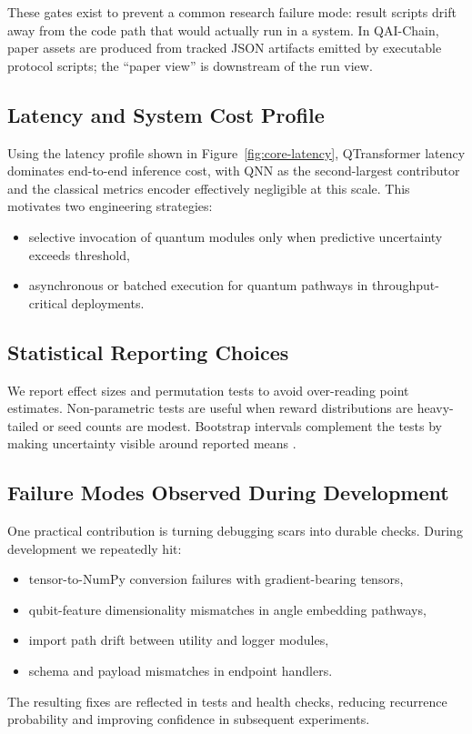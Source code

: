 These gates exist to prevent a common research failure mode: result scripts drift away from the code path that would actually run in a system. In QAI-Chain, paper assets are produced from tracked JSON artifacts emitted by executable protocol scripts; the ``paper view'' is downstream of the run view.

\subsection{Latency and System Cost Profile}
\label{sec:latency-profile}

Using the latency profile shown in Figure~\ref{fig:core-latency}, QTransformer latency dominates end-to-end inference cost, with QNN as the second-largest contributor and the classical metrics encoder effectively negligible at this scale. This motivates two engineering strategies:
\begin{itemize}
  \item selective invocation of quantum modules only when predictive uncertainty exceeds threshold,
  \item asynchronous or batched execution for quantum pathways in throughput-critical deployments.
\end{itemize}

\subsection{Statistical Reporting Choices}

We report effect sizes and permutation tests to avoid over-reading point estimates. Non-parametric tests are useful when reward distributions are heavy-tailed or seed counts are modest. Bootstrap intervals complement the tests by making uncertainty visible around reported means \citep{efron1994introduction,good2005permutation}.

\subsection{Failure Modes Observed During Development}

One practical contribution is turning debugging scars into durable checks. During development we repeatedly hit:
\begin{itemize}
  \item tensor-to-NumPy conversion failures with gradient-bearing tensors,
  \item qubit-feature dimensionality mismatches in angle embedding pathways,
  \item import path drift between utility and logger modules,
  \item schema and payload mismatches in endpoint handlers.
\end{itemize}

The resulting fixes are reflected in tests and health checks, reducing recurrence probability and improving confidence in subsequent experiments.
